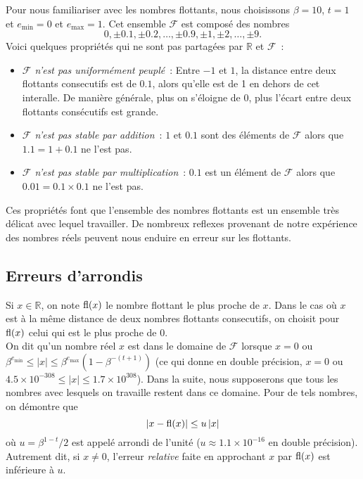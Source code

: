 \documentclass{article}
\newcommand{\R}{\mathbb{R}}
\newcommand{\abs}[1]{\left|#1\right|}
\newcommand{\fl}[1]{{\rm fl}(#1)}
\begin{document}
Pour nous familiariser avec les nombres flottants, nous choisissons
$\beta=10$, $t=1$ et $e_\text{min}=0$ et $e_\text{max}=1$.  Cet ensemble
$\mathcal{F}$ est composé des nombres
\[0, \pm 0.1, \pm 0.2, \ldots,
  \pm 0.9, \pm 1, \pm 2, \ldots, \pm 9.\] 
Voici quelques propriétés qui ne sont pas partagées par $\R$ et
$\mathcal{F}$~:
\begin{itemize}
	\item \emph{$\mathcal{F}$ n'est pas uniformément peuplé}~: Entre $-1$ et $1$,
		la distance entre deux flottants consecutifs est de $0.1$, alors qu'elle
		est de 1 en dehors de cet interalle. De manière générale, plus on
		s'éloigne de 0, plus l'écart entre deux flottants consécutifs est
		grande.
	\item \emph{$\mathcal{F}$ n'est pas stable par addition}~:
	  $1$ et $0.1$ sont des éléments de $\mathcal{F}$ alors que
		$1.1=1 + 0.1$ ne l'est pas.
	\item \emph{$\mathcal{F}$ n'est pas stable par multiplication}~:
	  $0.1$ est un élément de $\mathcal{F}$ alors que $0.01 = 0.1 \times 0.1$
		ne l'est pas.
\end{itemize}
Ces propriétés font que l'ensemble des nombres flottants est un ensemble très
délicat avec lequel travailler. De nombreux reflexes provenant de notre
expérience des nombres réels peuvent nous enduire en erreur sur les flottants.

\subsection{Erreurs d'arrondis}

Si $x\in\R$, on note $\fl{x}$ le nombre flottant le plus proche de $x$.
Dans le cas où $x$ est à la même distance de deux nombres flottants consecutifs,
on choisit pour $\fl{x}$ celui qui est le plus proche de 0.\\

On dit qu'un nombre réel $x$ est dans le domaine de $\mathcal{F}$ lorsque
$x=0$ ou $\beta^{e_\text{min}} \leq |x| \leq \beta^{e_\text{max}}(1-\beta^{-(t+1)})$
(ce qui donne en double précision, $x=0$ ou $4.5 \times 10^{-308} \leq \abs{x} \leq
1.7 \times 10^{308}$). Dans la
suite, nous supposerons que tous les nombres avec lesquels on travaille
restent dans ce domaine. Pour de tels nombres, on démontre que
\[\abs{x-\fl{x}}\leq u \abs{x}\]
où $u=\beta^{1-t}/2$ est appelé arrondi de l'unité
($u\approx 1.1 \times 10^{-16}$ en double précision).
Autrement dit, si $x\neq 0$, l'erreur \emph{relative} faite en approchant $x$ par
$\fl{x}$ est inférieure à $u$.\\
\end{document}
